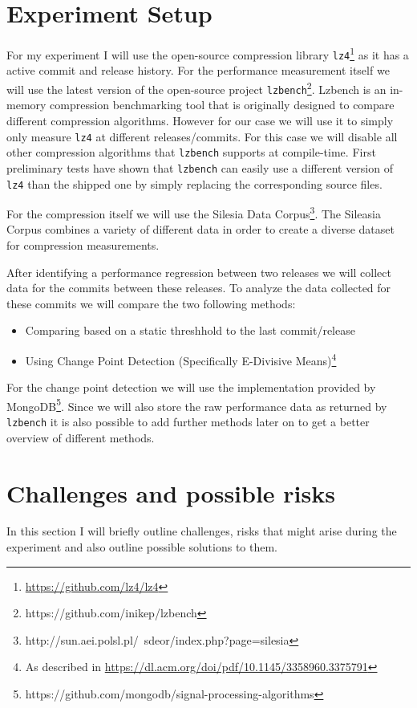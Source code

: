 \documentclass[	runningheads,
				a4paper]{llncs}
\begin{document}
\section{Experiment Setup}

For my experiment I will use the open-source compression library \texttt{lz4}\footnote{\url{https://github.com/lz4/lz4}} as it has a active commit and release history. For the performance measurement itself we will use the latest version of the open-source project \texttt{lzbench}\footnote{https://github.com/inikep/lzbench}. Lzbench is an in-memory compression benchmarking tool that is originally designed to compare different compression algorithms. However for our case we will use it to simply only measure \texttt{lz4} at different releases/commits. For this case we will disable all other compression algorithms that \texttt{lzbench} supports at compile-time. First preliminary tests have shown that \texttt{lzbench} can easily use a different version of \texttt{lz4} than the shipped one by simply replacing the corresponding source files.

For the compression itself we will use the Silesia Data Corpus\footnote{http://sun.aei.polsl.pl/~sdeor/index.php?page=silesia}. The Sileasia Corpus combines a variety of different data in order to create a diverse dataset for compression measurements. 

After identifying a performance regression between two releases we will collect data for the commits between these releases. To analyze the data collected for these commits we will compare the two following methods:
\begin{itemize}
	\item Comparing based on a static threshhold to the last commit/release
	\item Using Change Point Detection (Specifically E-Divisive Means)\footnote{As described in \url{https://dl.acm.org/doi/pdf/10.1145/3358960.3375791}}
\end{itemize}

For the change point detection we will use the implementation provided by MongoDB\footnote{https://github.com/mongodb/signal-processing-algorithms}. Since we will also store the raw performance data as returned by \texttt{lzbench} it is also possible to add further methods later on to get a better overview of different methods.

\section{Challenges and possible risks}
In this section I will briefly outline challenges, risks that might arise during the experiment and also outline possible solutions to them.
\end{document}
